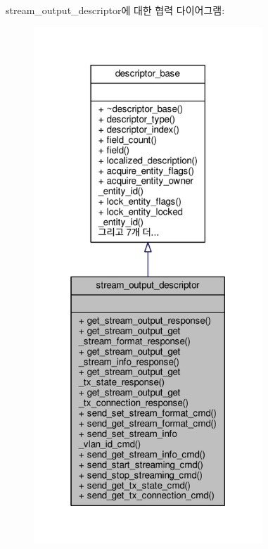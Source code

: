stream\+\_\+output\+\_\+descriptor에 대한 협력 다이어그램\+:
\nopagebreak
\begin{figure}[H]
\begin{center}
\leavevmode
\includegraphics[height=550pt]{classavdecc__lib_1_1stream__output__descriptor__coll__graph}
\end{center}
\end{figure}
